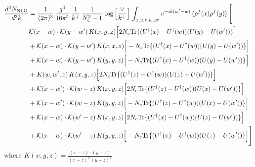 \documentclass[9pt]{article}
\numberwithin{equation}{section}
\begin{document}
\begin{align}
\frac{d^{3}N_{\mathrm{NLO}}}{d^{3}k} & = \frac{1}{(2\pi)^{3}}\,\frac{g^{4}}{16\pi^{5}}\,\frac{1}{k^{+}}\,\frac{1}{N^{2}_{c}-1}\,\log\Big[\frac{\vee}{k^{+}}\Big]\,\int_{x,y,z,w,w'}e^{-ik(w'-w)}\,\langle\rho^{f}(x)\rho^{f}(y) \rangle\,\Bigg[ \notag\\ & \mathcal K(x-w)\cdot\mathcal K(y-w')\,K(x,y,z)\Big[2 N_{c}{\rm Tr}\{(U^\dagger(x)-U^\dagger(w))(U(y)-U(w'))\}\Big]\notag\\
&+\mathcal K(x-w)\cdot\mathcal K(y-w')\,K(x,x,z)\Big[-N_{c}{\rm Tr}\{(U^\dagger(x)-U^\dagger(w))(U(y)-U(w'))\}\Big]\notag\\
&+\mathcal K(x-w)\cdot\mathcal K(y-w')\,K(y,y,z)\Big[-N_{c}{\rm Tr}\{(U^\dagger(x)-U^\dagger(w))(U(y)-U(w'))\}\Big]\notag\\
&+K(w,w',z)\,K(x,y,z)\Big[2 N_{c}{\rm Tr}\{(U^\dagger(z)-U^\dagger(w))(U(z)-U(w'))\}\Big]\notag\\
&+\mathcal K(x-w')\cdot\mathcal K(w-z)\,K(x,y,z)\Big[2 N_{c}{\rm Tr}\{(U^\dagger(z)-U^\dagger(w))(U(x)-U(w'))\}\Big]\notag\\
&+\mathcal K(x-w')\cdot\mathcal K(w-z)\,K(y,y,z)\Big[-N_{c}{\rm Tr}\{(U^\dagger(z)-U^\dagger(w))(U(x)-U(w'))\}\Big]\notag\\
&+\mathcal K(x-w)\cdot\mathcal K(w'-z)\,K(x,y,z)\Big[2 N_{c}{\rm Tr}\{(U^\dagger(x)-U^\dagger(w))(U(z)-U(w'))\}\Big]\notag\\
&+\mathcal K(x-w)\cdot\mathcal K(w'-z)\,K(y,y,z)\Big[-N_{c}{\rm Tr}\{(U^\dagger(x)-U^\dagger(w))(U(z)-U(w'))\}\Big]\Bigg]
\end{align}
where $K(x,y,z) = \frac{(x-z)\cdot (y-z)}{(x-z)^{2}\, (y-z)^{2}}$
\end{document}
